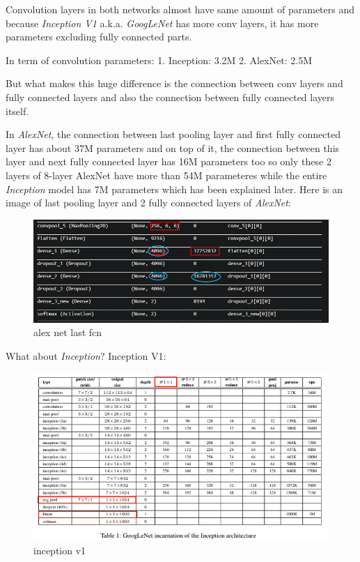 \documentclass[11pt]{article}
\makeatletter
\def\maxwidth{\ifdim\Gin@nat@width>\linewidth\linewidth
    \else\Gin@nat@width\fi}
\let\Oldincludegraphics\includegraphics
\renewcommand{\includegraphics}[1]{\Oldincludegraphics[width=.8\maxwidth]{#1}}
\makeatother
\begin{document}
Convolution layers in both networks almost have same amount of
parameters and because \emph{Inception V1} a.k.a. \emph{GoogLeNet} has
more conv layers, it has more parameters excluding fully connected
parts.

In term of convolution parameters: 1. Inception: 3.2M 2. AlexNet: 2.5M

But what makes this huge difference is the connection between conv
layers and fully connected layers and also the connection between fully
connected layers itself.

In \emph{AlexNet}, the connection between last pooling layer and first
fully connected layer has about 37M parameters and on top of it, the
connection between this layer and next fully connected layer has 16M
parameters too so only these 2 layers of 8-layer AlexNet have more than
54M parameteres while the entire \emph{Inception} model has 7M
parameters which has been explained later. Here is an image of last
pooling layer and 2 fully connected layers of \emph{AlexNet}:

\begin{figure}
\centering
\includegraphics{wiki/1_d_3.png}
\caption{alex net last fcn}
\end{figure}

What about \emph{Inception}? Inception V1:

\begin{figure}
\centering
\includegraphics{wiki/1_d_2.png}
\caption{inception v1}
\end{figure}
\end{document}
